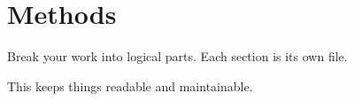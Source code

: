 \section{Methods}

Break your work into logical parts. Each section is its own file.

This keeps things readable and maintainable.
